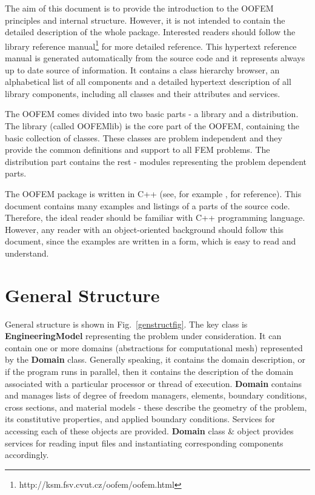 \documentclass[a4paper]{article}
\newcommand{\class}[1]{{\bf #1}}
\newcommand{\refman}{\oofem library reference manual}
\begin{document}
The aim of this document is to provide the introduction to the OOFEM
principles and internal structure. However, it is not intended to
contain the detailed description of the whole package. Interested readers
should follow the \refman\footnote{http://ksm.fsv.cvut.cz/oofem/oofem.html} for more
detailed reference. This hypertext reference
manual is generated automatically from the source code and it
represents always up to date source of information. It contains a class
hierarchy browser, an alphabetical list of all components and a
detailed hypertext description of all library components, including
all classes and their attributes and services.


The OOFEM comes divided into two basic parts - a library and
a distribution. The library (called OOFEMlib) is the core part of the OOFEM, containing
the basic collection of classes. These classes are problem independent
and they provide the common definitions and support to all FEM
problems. The distribution part contains the rest - modules representing the problem dependent
parts. 

The OOFEM package is written in C++ (see, for example \cite{c++}, for reference). This 
document contains many examples and listings of a parts of the source
code. Therefore, the ideal reader should be familiar with C++ programming
language. However, any reader with an object-oriented background should
follow this document, since the examples are written in a form, which is 
easy to read and understand.

\section{General Structure}

General structure is shown in Fig.~\ref{genstructfig}.
The key class is \class{EngineeringModel} representing the problem
under consideration. It can contain one or more domains (abstractions
for computational mesh) represented by the \class{Domain} class.
Generally
speaking, it contains the domain description, or if the program runs in
parallel, then it contains the description of the domain associated
with a particular processor or thread of execution. \class{Domain} 
contains and manages lists of degree of freedom managers, elements, boundary
conditions, cross sections, and material models - these describe the geometry
of the problem, its constitutive properties, and applied boundary
conditions. Services for accessing each of these objects are
provided. 
\class{Domain} class \& object provides services for reading input
files and instantiating corresponding components accordingly. 
\end{document}
